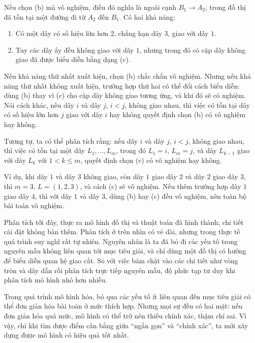 \documentclass[11pt]{article}
\begin{document}
Nếu chọn (b) mà vô nghiệm, điều đó nghĩa là ngoài cạnh \(B_1\to A_2\), trong
đồ thị đã tồn tại một đường đi từ \(A_2\) đến \(B_1\). Có hai khả năng:
\begin{enumerate}
  \item Có một dây có số hiệu lớn hơn \(2\), chẳng hạn dây \(3\), giao với dây
  \(1\).
  \item Tuy các dây ấy đều không giao với dây \(1\), nhưng trong đó có cặp
  dây không giao đã được biểu diễn bằng dạng (c).
\end{enumerate}
Nếu khả năng thứ nhất xuất hiện, chọn (b) chắc chắn vô nghiệm. Nhưng nếu khả
năng thứ nhất không xuất hiện, trường hợp thứ hai có thể đổi cách biểu diễn:
dùng (b) thay vì (c) cho cặp dây không giao tương ứng, và khi đó sẽ có nghiệm.
Nói cách khác, nếu dây \(i\) và dây \(j\), \(i<j\), không giao nhau, thì việc
có tồn tại dây có số hiệu lớn hơn \(j\) giao với dây \(i\) hay không quyết
định chọn (b) có vô nghiệm hay không.

Tương tự, ta có thể phân tích rằng: nếu dây \(i\) và dây \(j\), \(i<j\),
không giao nhau, thì việc có tồn tại một dãy \(L_1,\ldots,L_m\), trong đó
\(L_1=i\), \(L_m=j\), và dây \(L_{k-1}\) giao với dây \(L_k\) với
\(1<k\le m\), quyết định chọn (c) có vô nghiệm hay không.

Ví dụ, khi dây \(1\) và dây \(3\) không giao, còn dây \(1\) giao dây \(2\) và
dây \(2\) giao dây \(3\), thì \(m=3\), \(L=(1,2,3)\), và cách (c) sẽ vô
nghiệm. Nếu thêm trường hợp dây \(1\) giao dây \(4\), thì với dây \(1\) và
dây \(3\), dùng (b) hay (c) đều vô nghiệm, nên toàn bộ bài toán vô nghiệm.

Phân tích tới đây, thực ra mô hình đồ thị và thuật toán đã hình thành; chi
tiết cài đặt không bàn thêm. Phân tích ở trên nhìn có vẻ dài, nhưng trong
thực tế quá trình suy nghĩ rất tự nhiên. Nguyên nhân là ta đã bỏ đi các yếu
tố trong nguyên mẫu không liên quan tới mục tiêu giải, và chỉ dùng một đồ thị
có hướng để biểu diễn quan hệ giao cắt. So với việc bám chặt vào các chi
tiết như vòng tròn và dây dẫn rồi phân tích trực tiếp nguyên mẫu, độ phức tạp
tư duy khi phân tích mô hình nhỏ hơn nhiều.

Trong quá trình mô hình hóa, bỏ qua các yếu tố ít liên quan đến mục tiêu giải
có thể đơn giản hóa bài toán ở mức thích hợp. Nhưng mọi sự đều có hai mặt:
nếu đơn giản hóa quá mức, mô hình có thể trở nên thiếu chính xác, thậm chí
sai. Vì vậy, chỉ khi tìm được điểm cân bằng giữa ``ngắn gọn'' và ``chính
xác'', ta mới xây dựng được mô hình có hiệu quả tốt nhất.
\end{document}
